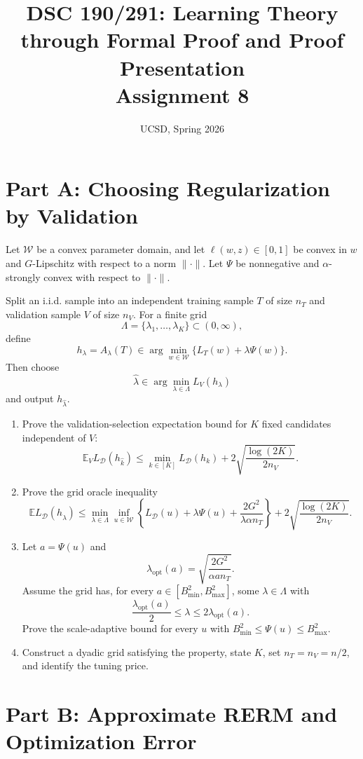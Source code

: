 \documentclass{article}
\title{DSC 190/291: Learning Theory through Formal Proof and Proof Presentation\\Assignment 8}
\date{UCSD, Spring 2026}
\begin{document}
\maketitle

\section{Part A: Choosing Regularization by Validation}

Let $\mathcal{W}$ be a convex parameter domain, and let $\ell(w,z)\in[0,1]$ be convex in $w$ and $G$-Lipschitz with respect to a norm $\|\cdot\|$. Let $\Psi$ be nonnegative and $\alpha$-strongly convex with respect to $\|\cdot\|$.

Split an i.i.d. sample into an independent training sample $T$ of size $n_T$ and validation sample $V$ of size $n_V$. For a finite grid
$$
\Lambda=\{\lambda_1,\dots,\lambda_K\}\subset(0,\infty),
$$
define
$$
h_\lambda=A_\lambda(T)\in\arg\min_{w\in\mathcal{W}}\{L_T(w)+\lambda\Psi(w)\}.
$$
Then choose
$$
\widehat{\lambda}\in\arg\min_{\lambda\in\Lambda}L_V(h_\lambda)
$$
and output $h_{\widehat{\lambda}}$.

\begin{enumerate}
\item Prove the validation-selection expectation bound for $K$ fixed candidates independent of $V$:
$$
\mathbb{E}_V L_{\mathcal{D}}(h_{\widehat{k}})
\le
\min_{k\in[K]}L_{\mathcal{D}}(h_k)
+
2\sqrt{\frac{\log(2K)}{2n_V}}.
$$
\item Prove the grid oracle inequality
$$
\mathbb{E}L_{\mathcal{D}}(h_{\widehat{\lambda}})
\le
\min_{\lambda\in\Lambda}\inf_{u\in\mathcal{W}}
\left\{
L_{\mathcal{D}}(u)+\lambda\Psi(u)+\frac{2G^2}{\lambda\alpha n_T}
\right\}
+
2\sqrt{\frac{\log(2K)}{2n_V}}.
$$
\item Let $a=\Psi(u)$ and
$$
\lambda_{\mathrm{opt}}(a)=\sqrt{\frac{2G^2}{\alpha a n_T}}.
$$
Assume the grid has, for every $a\in[B_{\min}^2,B_{\max}^2]$, some $\lambda\in\Lambda$ with
$$
\frac{\lambda_{\mathrm{opt}}(a)}{2}\le \lambda\le 2\lambda_{\mathrm{opt}}(a).
$$
Prove the scale-adaptive bound for every $u$ with $B_{\min}^2\le \Psi(u)\le B_{\max}^2$.
\item Construct a dyadic grid satisfying the property, state $K$, set $n_T=n_V=n/2$, and identify the tuning price.
\end{enumerate}

\section{Part B: Approximate RERM and Optimization Error}
\end{document}
